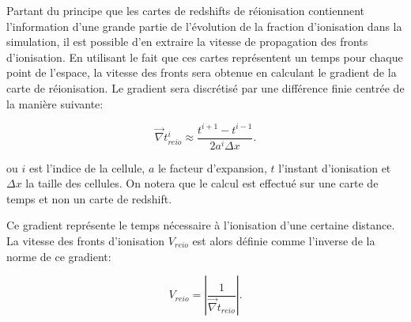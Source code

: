 Partant du principe que les cartes de redshifts de réionisation contiennent l'information d'une grande partie de l'évolution de la fraction d'ionisation dans la simulation, il est possible d'en extraire la vitesse de propagation des fronts d'ionisation.
En utilisant le fait que ces cartes représentent un temps pour chaque point de l'espace, la vitesse des fronts sera obtenue en calculant le gradient de la carte de réionisation.
Le gradient sera discrétisé par une différence finie centrée de la manière suivante:

\begin{equation}
\vec{\nabla} t_{reio}^i \approx \frac{t^{i+1}  - t^{i-1}}{2a^i \Delta x }. %
\end{equation}

ou $i$ est l'indice de la cellule, $a$ le facteur d'expansion, $t$ l'instant d'ionisation et $\Delta x$ la taille des cellules.
On notera que le calcul est effectué sur une carte de temps et non un carte de redshift.

Ce gradient représente le temps nécessaire à l'ionisation d'une certaine distance.
La vitesse des fronts d'ionisation $V_{reio}$ est alors définie comme l'inverse de la norme de ce gradient:

\begin{equation}
V_{reio}  = \left | \frac{1}{ \vec{\nabla} t_{reio}} \right| .
\end{equation}

